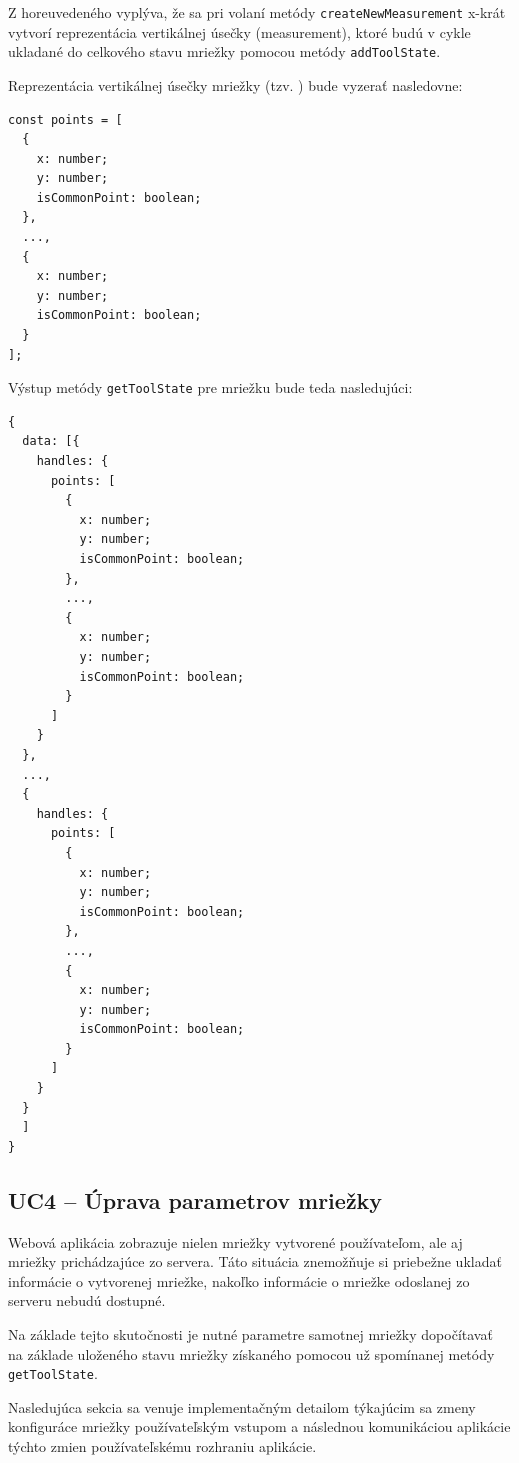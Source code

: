 Z horeuvedeného vyplýva, že sa pri volaní metódy \texttt{createNewMeasurement} x-krát vytvorí reprezentácia vertikálnej úsečky (measurement), ktoré budú v cykle ukladané do celkového stavu mriežky pomocou metódy \texttt{addToolState}.

Reprezentácia vertikálnej úsečky mriežky (tzv. ) bude vyzerať nasledovne:

\begin{minipage}[]{\linewidth}
\begin{verbatim}
const points = [
  {
    x: number;
    y: number;
    isCommonPoint: boolean;
  },
  ...,
  {
    x: number;
    y: number;
    isCommonPoint: boolean;
  }
];
\end{verbatim}
\end{minipage}

Výstup metódy \texttt{getToolState} pre mriežku bude teda nasledujúci:

\begin{minipage}[]{\linewidth}
\begin{verbatim}
{
  data: [{
    handles: {
      points: [
        {
          x: number;
          y: number;
          isCommonPoint: boolean;
        },
        ...,
        {
          x: number;
          y: number;
          isCommonPoint: boolean;
        }
      ]
    }
  },
  ...,
  {
    handles: {
      points: [
        {
          x: number;
          y: number;
          isCommonPoint: boolean;
        },
        ...,
        {
          x: number;
          y: number;
          isCommonPoint: boolean;
        }
      ]
    }
  }
  ]
}
\end{verbatim}
\end{minipage}

\subsection {UC4 -- Úprava parametrov mriežky}
Webová aplikácia zobrazuje nielen mriežky vytvorené používateľom, ale aj mriežky prichádzajúce zo servera. Táto situácia znemožňuje si priebežne ukladať informácie o vytvorenej mriežke, nakoľko informácie o mriežke odoslanej zo serveru nebudú dostupné.

Na základe tejto skutočnosti je nutné parametre samotnej mriežky dopočítavať na základe uloženého stavu mriežky získaného pomocou už spomínanej metódy \texttt{getToolState}.

Nasledujúca sekcia sa venuje implementačným detailom týkajúcim sa zmeny konfiguráce mriežky používateľským vstupom a následnou komunikáciou aplikácie týchto zmien používateľskému rozhraniu aplikácie.

